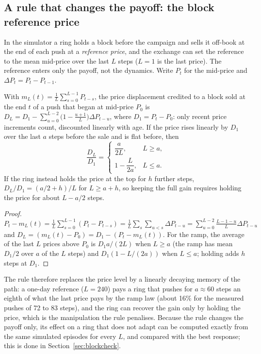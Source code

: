 \subsection{A rule that changes the payoff: the block reference price}\label{sec:blocklaw}

In the simulator a ring holds a block before the campaign and sells it off-book at the end of each push at a \emph{reference price}, and the exchange can set the reference to the mean mid-price over the last $L$ steps ($L=1$ is the last price). The reference enters only the payoff, not the dynamics. Write $P_t$ for the mid-price and $\Delta P_t=P_t-P_{t-1}$.

\begin{proposition}\label{prop:block}
With $m_L(t)=\frac1L\sum_{s=0}^{L-1}P_{t-s}$, the price displacement credited to a block sold at the end $t$ of a push that began at mid-price $P_0$ is $D_L=D_1-\sum_{u=0}^{L-2}\bigl(1-\tfrac{u+1}{L}\bigr)\Delta P_{t-u}$, where $D_1=P_t-P_0$: only recent price increments count, discounted linearly with age. If the price rises linearly by $D_1$ over the last $a$ steps before the sale and is flat before, then
\begin{equation}
\frac{D_L}{D_1}=\begin{cases}\dfrac{a}{2L}, & L\ge a,\\[1ex] 1-\dfrac{L}{2a}, & L\le a.\end{cases}
\label{eq:blocklaw}
\end{equation}
If the ring instead holds the price at the top for $h$ further steps, $D_L/D_1=(a/2+h)/L$ for $L\ge a+h$, so keeping the full gain requires holding the price for about $L-a/2$ steps.
\end{proposition}
\begin{proof}
$P_t-m_L(t)=\frac1L\sum_{s=0}^{L-1}(P_t-P_{t-s})=\frac1L\sum_{s}\sum_{u<s}\Delta P_{t-u}=\sum_{u=0}^{L-2}\frac{L-1-u}{L}\Delta P_{t-u}$ and $D_L=(m_L(t)-P_0)=D_1-(P_t-m_L(t))$. For the ramp, the average of the last $L$ prices above $P_0$ is $D_1a/(2L)$ when $L\ge a$ (the ramp has mean $D_1/2$ over $a$ of the $L$ steps) and $D_1(1-L/(2a))$ when $L\le a$; holding adds $h$ steps at $D_1$. \qedhere
\end{proof}

The rule therefore replaces the price level by a linearly decaying memory of the path: a one-day reference ($L=240$) pays a ring that pushes for $a\approx60$ steps an eighth of what the last price pays by the ramp law (about 16\% for the measured pushes of 72 to 83 steps), and the ring can recover the gain only by holding the price, which is the manipulation the rule penalises. Because the rule changes the payoff only, its effect on a ring that does not adapt can be computed exactly from the same simulated episodes for every $L$, and compared with the best response; this is done in Section~\ref{sec:blockcheck}.

